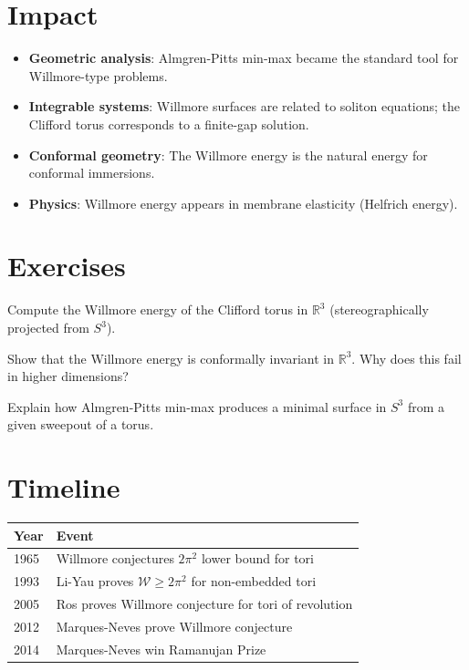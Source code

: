 \section{Impact}
\begin{itemize}
\item \textbf{Geometric analysis}: Almgren-Pitts min-max became the standard tool for Willmore-type problems.
\item \textbf{Integrable systems}: Willmore surfaces are related to soliton equations; the Clifford torus corresponds to a finite-gap solution.
\item \textbf{Conformal geometry}: The Willmore energy is the natural energy for conformal immersions.
\item \textbf{Physics}: Willmore energy appears in membrane elasticity (Helfrich energy).
\end{itemize}

\section{Exercises}

\begin{exercise}[Basic]
Compute the Willmore energy of the Clifford torus in $\mathbb{R}^3$ (stereographically projected from $S^3$).
\end{exercise}

\begin{exercise}[Intermediate]
Show that the Willmore energy is conformally invariant in $\mathbb{R}^3$. Why does this fail in higher dimensions?
\end{exercise}

\begin{exercise}[Advanced]
Explain how Almgren-Pitts min-max produces a minimal surface in $S^3$ from a given sweepout of a torus.
\end{exercise}

\section{Timeline}

\begin{tabularx}{\linewidth}{lX}
\toprule
\textbf{Year} & \textbf{Event} \\ \midrule
1965 & Willmore conjectures $2\pi^2$ lower bound for tori \\ 
1993 & Li-Yau proves $\mathcal{W} \ge 2\pi^2$ for non-embedded tori \\ 
2005 & Ros proves Willmore conjecture for tori of revolution \\ 
2012 & Marques-Neves prove Willmore conjecture \\
2014 & Marques-Neves win Ramanujan Prize \\ \bottomrule
\end{tabularx}

